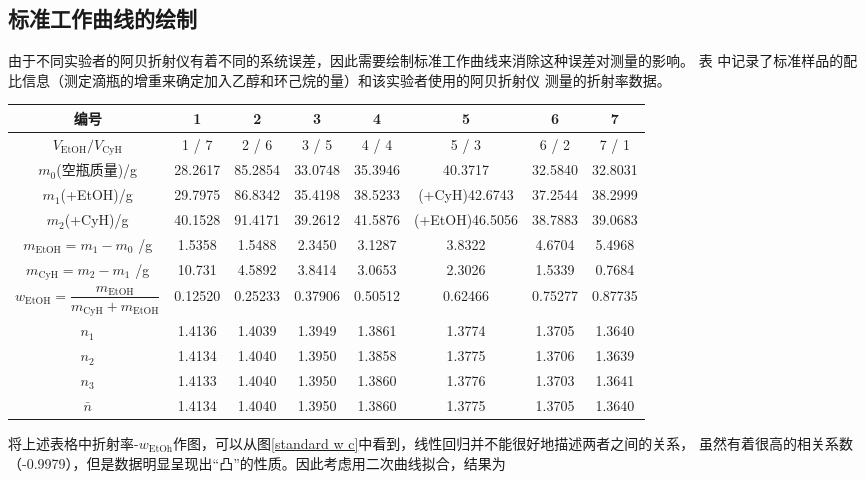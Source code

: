 \documentclass[12pt]{article}
\newcommand{\mr}[1]{\mathrm{#1}}
\begin{document}
 		\subsection{标准工作曲线的绘制}
		\par 
		由于不同实验者的阿贝折射仪有着不同的系统误差，因此需要绘制标准工作曲线来消除这种误差对测量的影响。
		表 中记录了标准样品的配比信息（测定滴瓶的增重来确定加入乙醇和环己烷的量）和该实验者使用的阿贝折射仪
		测量的折射率数据。
		\begin{table}[h]
			\centering
			\begin{tabular}{cccccccc}
				\toprule
			    编号 & 1 & 2 & 3 & 4 & 5 & 6 & 7 \\
				\midrule
				$V_{\mr{EtOH}}/V_{\mr{CyH}}$ & 1 / 7 & 2 / 6 & 3 / 5 & 4 / 4 & 5 / 3 & 6 / 2 & 7 / 1 \\
				$m_0$(空瓶质量)/g & 28.2617 & 85.2854 & 33.0748 & 35.3946 & 40.3717 & 32.5840 & 32.8031 \\
				$m_1$(+EtOH)/g & 29.7975 & 86.8342 & 35.4198 & 38.5233 & (+CyH)42.6743 & 37.2544 & 38.2999 \\
				$m_2$(+CyH)/g & 40.1528 & 91.4171 & 39.2612 & 41.5876 & (+EtOH)46.5056 & 38.7883 & 39.0683 \\
				$m_{\mr{EtOH}} = m_1 - m_0$ /g & 1.5358 & 1.5488 & 2.3450 & 3.1287 & 3.8322 & 4.6704 & 5.4968\\
				$m_{\mr{CyH}} = m_2 - m_1$ /g & 10.731 & 4.5892 & 3.8414 & 3.0653 & 2.3026 & 1.5339 & 0.7684 \\
				$w_{\mr{EtOH}} = \dfrac{m_{\mr{EtOH}}}{m_{\mr{CyH}} + m_{\mr{EtOH}}}$ &  0.12520 & 0.25233 & 0.37906 & 0.50512 & 0.62466 & 0.75277 & 0.87735\\
				$n_1$ & 1.4136 & 1.4039 & 1.3949 & 1.3861 & 1.3774 & 1.3705 & 1.3640 \\
				$n_2$ & 1.4134 & 1.4040 & 1.3950 & 1.3858 & 1.3775 & 1.3706 & 1.3639 \\
				$n_3$ & 1.4133 & 1.4040 & 1.3950 & 1.3860 & 1.3776 & 1.3703 & 1.3641 \\
				$\bar{n}$ & 1.4134 & 1.4040 & 1.3950 & 1.3860 &	1.3775 & 1.3705 & 1.3640 \\
				\bottomrule
			\end{tabular}
			\label{standard curve}
		\end{table}
		将上述表格中折射率-$w_{\mr{EtOh}}$作图，可以从图\ref{standard w c}中看到，线性回归并不能很好地描述两者之间的关系，
		虽然有着很高的相关系数（-0.9979），但是数据明显呈现出“凸”的性质。因此考虑用二次曲线拟合，结果为
\end{document}
